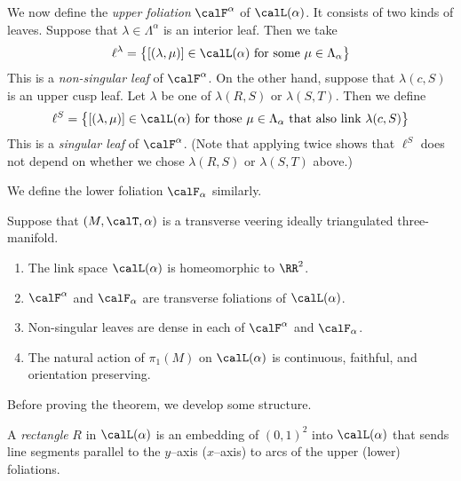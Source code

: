 \documentclass[12pt]{amsart}
\begin{document}
\begin{definition}
\label{Def:UpperFoliation}
We now define the \emph{upper foliation} $\calF^\alpha$ of $\calL(\alpha)$. It consists of two kinds of leaves.  Suppose that $\lambda \in \Lambda^\alpha$ is an interior leaf.  Then we take 
\[
\ell^\lambda = \big\{ [(\lambda, \mu)] \in \calL(\alpha) \mbox{ for some $\mu \in \Lambda_\alpha$} \big\}
\]
This is a \emph{non-singular leaf} of $\calF^\alpha$.  On the other hand, suppose that $\lambda(c,S)$ is an upper cusp leaf.  Let $\lambda$ be one of $\lambda(R,S)$ or $\lambda(S, T)$.  Then we define 
\[
\ell^S = \big\{ [(\lambda, \mu)] \in \calL(\alpha) \mbox{ for those $\mu \in \Lambda_\alpha$ that also link $\lambda(c,S)$} \big\}
\]
This is a \emph{singular leaf} of $\calF^\alpha$.  (Note that applying  twice shows that $\ell^S$ does not depend on whether we chose $\lambda(R,S)$ or $\lambda(S, T)$ above.)  

We define the lower foliation $\calF_\alpha$ similarly.
\end{definition}
 
\begin{theorem}
\label{Thm:LinkSpace}
Suppose that $(M, \calT, \alpha)$ is a transverse veering ideally triangulated three-manifold.  
\begin{enumerate}
\item
\label{Itm:LinkSpacePlane}
The link space $\calL(\alpha)$ is homeomorphic to $\RR^2$.  
\item
\label{Itm:LinkSpaceTransverse}
$\calF^\alpha$ and $\calF_\alpha$ are transverse foliations of $\calL(\alpha)$.  
\item
\label{Itm:LinkSpaceDense}
Non-singular leaves are dense in each of $\calF^\alpha$ and $\calF_\alpha$. 
\item
\label{Itm:LinkSpaceAction}
The natural action of $\pi_1(M)$ on $\calL(\alpha)$ is continuous, faithful, and orientation preserving.
\end{enumerate}
\end{theorem}

Before proving the theorem, we develop some structure.   

\begin{definition}
\label{Def:Rectangle}
A \emph{rectangle} $R$ in $\calL(\alpha)$ is an embedding of $(0,1)^2$ into $\calL(\alpha)$ that sends line segments parallel to the $y$--axis ($x$--axis) to arcs of the upper (lower) foliations.  
\end{definition}
\end{document}
